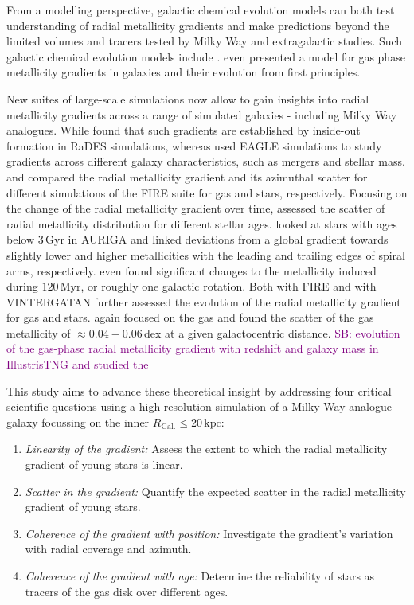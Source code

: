 \documentclass[fleqn,usenatbib]{mnras}
\newcommand{\SB}[1]{{\textcolor{purple}{SB: #1}}}
\begin{document}
From a modelling perspective, galactic chemical evolution models can both test understanding of radial metallicity gradients and make predictions beyond the limited volumes and tracers tested by Milky Way and extragalactic studies. Such galactic chemical evolution models include \citet{Chiappini2001, Minchev2014b, Kubryk2015, Stanghellini2015, Matteucci2001b}. \citet{Sharda2021} even presented a model for gas phase metallicity gradients in galaxies and their evolution from first principles.

New suites of large-scale simulations now allow to gain insights into radial metallicity gradients across a range of simulated galaxies - including Milky Way analogues. While \citet{Pilkington2012} found that such gradients are established by inside-out formation in RaDES simulations, whereas \citet{Tissera2019} used EAGLE simulations to study gradients across different galaxy characteristics, such as mergers and stellar mass. \citet{Bellardini2021} and \citet{Bellardini2022, Graf2024} compared the radial metallicity gradient and its azimuthal scatter for different simulations of the FIRE suite for gas and stars, respectively. Focusing on the change of the radial metallicity gradient over time, \citet{Grand2015} assessed the scatter of radial metallicity distribution for different stellar ages. \citet{Grand2016} looked at stars with ages below $3\,\mathrm{Gyr}$ in AURIGA and linked deviations from a global gradient towards slightly lower and higher metallicities with the leading and trailing edges of spiral arms, respectively. \citet{Grand2016} even found significant changes to the metallicity induced during $120\,\mathrm{Myr}$, or roughly one galactic rotation. Both \citet[][see their Fig. 6]{Ma2017} with FIRE and \citet[see their Fig. 9][]{Agertz2021} with VINTERGATAN further assessed the evolution of the radial metallicity gradient for gas and stars. \citet{Khoperskov2023e} again focused on the gas and found the scatter of the gas metallicity of $\approx 0.04-0.06\,\mathrm{dex}$ at a given galactocentric distance. \SB{\citet{Hemler2021} evolution of the gas-phase radial metallicity gradient with redshift and galaxy mass in IllustrisTNG and \citet{Garcia2023} studied the }

This study aims to advance these theoretical insight by addressing four critical scientific questions using a high-resolution simulation of a Milky Way analogue galaxy focussing on the inner $R_\mathrm{Gal.} \leq 20\,\mathrm{kpc}$:
\begin{enumerate}
\item \textit{Linearity of the gradient:} Assess the extent to which the radial metallicity gradient of young stars is linear.
\item \textit{Scatter in the gradient:} Quantify the expected scatter in the radial metallicity gradient of young stars.
\item \textit{Coherence of the gradient with position:} Investigate the gradient's variation with radial coverage and azimuth.
\item \textit{Coherence of the gradient with age:} Determine the reliability of stars as tracers of the gas disk over different ages.
\end{enumerate}
\end{document}
